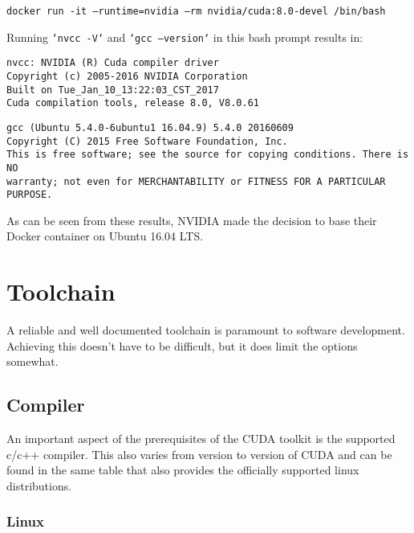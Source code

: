 \noindent \texttt{docker run -it --runtime=nvidia --rm nvidia/cuda:8.0-devel /bin/bash}\vspace{5mm}

\noindent Running \texttt{`nvcc -V`} and \texttt{`gcc --version`} in this bash prompt results in:\vspace{5mm}

\noindent \texttt{nvcc: NVIDIA (R) Cuda compiler driver}\\
\texttt{Copyright (c) 2005-2016 NVIDIA Corporation}\\
\texttt{Built on Tue\_Jan\_10\_13:22:03\_CST\_2017}\\
\texttt{Cuda compilation tools, release 8.0, V8.0.61}\vspace{4mm}

\noindent \texttt{gcc (Ubuntu 5.4.0-6ubuntu1~16.04.9) 5.4.0 20160609}\\
\texttt{Copyright (C) 2015 Free Software Foundation, Inc.}\\
\texttt{This is free software; see the source for copying conditions.  There is NO}\\
\texttt{warranty; not even for MERCHANTABILITY or FITNESS FOR A PARTICULAR PURPOSE.}\vspace{5mm}

\noindent As can be seen from these results, NVIDIA made the decision to base their Docker container on Ubuntu 16.04 LTS.

\newpage

\section*{Toolchain}

\hspace{4mm}A reliable and well documented toolchain is paramount to software development. Achieving this doesn't have to be difficult, but it does limit the options somewhat.

\subsection*{Compiler}

\hspace{4mm}An important aspect of the prerequisites of the CUDA toolkit is the supported c/c++ compiler. This also varies from version to version of CUDA and can be found in the same table that also provides the officially supported linux distributions.

\subsubsection*{Linux}

